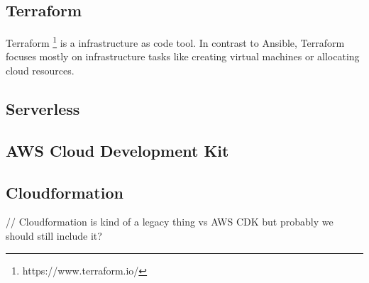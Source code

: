 \subsection{Terraform}

Terraform \footnote{https://www.terraform.io/} is a infrastructure as code tool. In contrast to Ansible, 
Terraform focuses mostly on infrastructure tasks like creating virtual machines or allocating cloud resources.

\subsection{Serverless}
\subsection{AWS Cloud Development Kit}
\subsection{Cloudformation}

// Cloudformation is kind of a legacy thing vs AWS CDK but probably we should still include it?